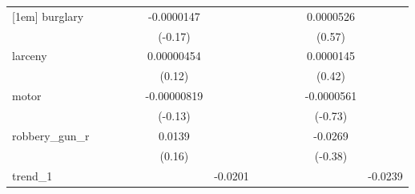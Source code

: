 {\begin{tabular}{l*{12}{c}}
[1em]
burglary    &                     &                     &                     &                     &  -0.0000147         &                     &                     &                     &                     &                     &   0.0000526         &                     \\
            &                     &                     &                     &                     &     (-0.17)         &                     &                     &                     &                     &                     &      (0.57)         &                     \\
[1em]
larceny     &                     &                     &                     &                     &  0.00000454         &                     &                     &                     &                     &                     &   0.0000145         &                     \\
            &                     &                     &                     &                     &      (0.12)         &                     &                     &                     &                     &                     &      (0.42)         &                     \\
[1em]
motor       &                     &                     &                     &                     & -0.00000819         &                     &                     &                     &                     &                     &  -0.0000561         &                     \\
            &                     &                     &                     &                     &     (-0.13)         &                     &                     &                     &                     &                     &     (-0.73)         &                     \\
[1em]
robbery\_gun\_r&                     &                     &                     &                     &      0.0139         &                     &                     &                     &                     &                     &     -0.0269         &                     \\
            &                     &                     &                     &                     &      (0.16)         &                     &                     &                     &                     &                     &     (-0.38)         &                     \\
[1em]
trend\_1     &                     &                     &                     &                     &                     &     -0.0201\sym{**} &                     &                     &                     &                     &                     &     -0.0239\sym{**} \\

\end{tabular}}
